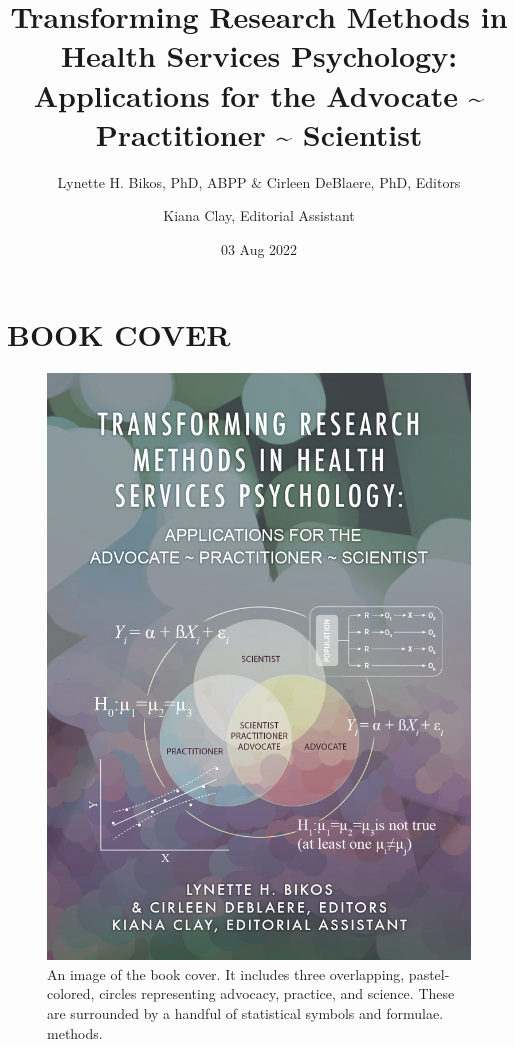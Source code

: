 \documentclass[
  11pt,
]{book}
\title{Transforming Research Methods in Health Services Psychology: Applications for the Advocate \textasciitilde{} Practitioner \textasciitilde{} Scientist}
\author{Lynette H. Bikos, PhD, ABPP \& Cirleen DeBlaere, PhD, Editors \and Kiana Clay, Editorial Assistant}
\date{03 Aug 2022}
\begin{document}
\maketitle

{
\hypersetup{linkcolor=}
\setcounter{tocdepth}{3}
\tableofcontents
}
\hypertarget{book-cover}{%
\chapter*{BOOK COVER}\label{book-cover}}

\begin{figure}
\centering
\includegraphics{images/bookcover.png}
\caption{An image of the book cover. It includes three overlapping, pastel-colored, circles representing advocacy, practice, and science. These are surrounded by a handful of statistical symbols and formulae. methods.}
\end{figure}
\end{document}
